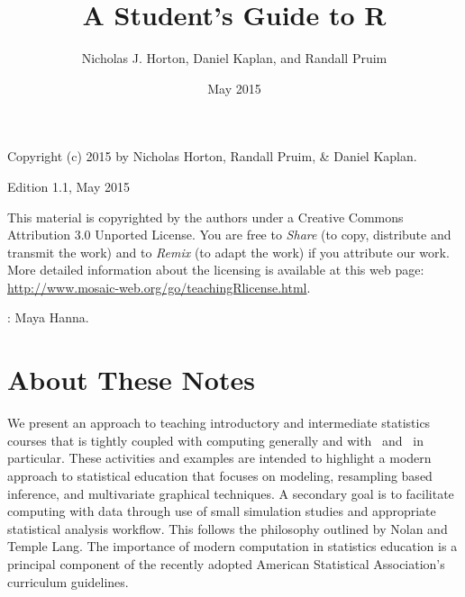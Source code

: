 \documentclass{tufte-book}\usepackage[]{graphicx}\usepackage[]{xcolor}
\title{A Student's Guide to R}
\author[Horton, Kaplan, Pruim]{ Nicholas J. Horton, Daniel Kaplan, and Randall Pruim}
\date{May 2015}
\begin{document}
\def\cplabel{^X} 

\def\tilde{\texttt{\~}}
\renewenvironment{knitrout}{}{\noindent\ignorespaces\!\!}







\newpage
\vspace*{2in}

\parbox{4in}{\noindent Copyright (c) 2015 by Nicholas Horton, Randall Pruim, \& Daniel Kaplan.}
\medskip

\parbox{4in}{\noindent Edition 1.1, May 2015}

\bigskip

\parbox{4in}{\noindent This material is copyrighted by the authors under a Creative Commons Attribution 3.0 Unported License. You are free to \emph{Share} (to copy, distribute and transmit the work) and to \emph{Remix} (to adapt the work) if you attribute our work. More detailed information about the licensing is available at this web page:
\url{http://www.mosaic-web.org/go/teachingRlicense.html}.
}


\vspace*{2.in}

\parbox{4in}{: Maya Hanna.}


\hspace*{1.3cm}\tableofcontents






\chapter*{About These Notes}


We present an approach to teaching introductory and intermediate
statistics courses that is tightly coupled with computing generally and with \R\ and \RStudio\ in particular. These activities and examples are intended to highlight a modern approach to statistical education that focuses on modeling, resampling based inference, and multivariate graphical techniques.  A secondary goal is to
facilitate computing with data through use of small simulation studies %
and appropriate statistical analysis workflow. This follows the
philosophy outlined by Nolan and Temple Lang\cite{nola:temp:2010}. The importance of modern computation\marginnote{$\ $} in statistics education is a principal component of the recently adopted American Statistical Association's curriculum guidelines\cite{ASAcurriculum2014}.
\end{document}
